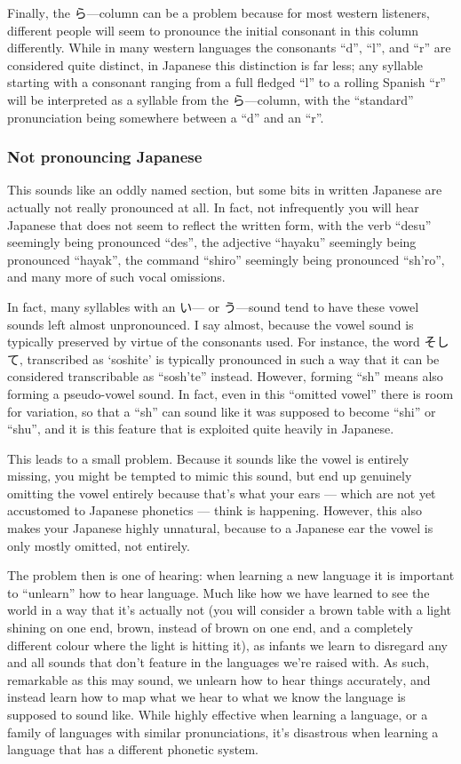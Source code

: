 \documentclass[11pt, b5paper, twoside, openright, onecolumn]{book}
\begin{document}
Finally‚ the ら—column can be a problem because for most western listeners‚ different people will seem to pronounce the initial consonant in this column differently. While in many western languages the consonants “d”‚ “l”‚ and “r” are considered quite distinct‚ in Japanese this distinction is far less; any syllable starting with a consonant ranging from a full fledged “l” to a rolling Spanish “r” will be interpreted as a syllable from the ら—column‚ with the “standard” pronunciation being somewhere between a “d” and an “r”.

\subsubsection{Not pronouncing Japanese}

This sounds like an oddly named section‚ but some bits in written Japanese are actually not really pronounced at all. In fact‚ not infrequently you will hear Japanese that does not seem to reflect the written form‚ with the verb “desu” seemingly being pronounced “des”‚ the adjective “hayaku” seemingly being pronounced “hayak”‚ the command “shiro” seemingly being pronounced “sh’ro”‚ and many more of such vocal omissions.

In fact‚ many syllables with an い— or う—sound tend to have these vowel sounds left almost unpronounced. I say almost‚ because the vowel sound is typically preserved by virtue of the consonants used. For instance‚ the word そして‚ transcribed as ‘soshite’ is typically pronounced in such a way that it can be considered transcribable as “sosh’te” instead. However‚ forming “sh” means also forming a pseudo-vowel sound. In fact‚ even in this “omitted vowel” there is room for variation‚ so that a “sh” can sound like it was supposed to become “shi” or “shu”‚ and it is this feature that is exploited quite heavily in Japanese.

This leads to a small problem. Because it sounds like the vowel is entirely missing‚ you might be tempted to mimic this sound‚ but end up genuinely omitting the vowel entirely because that’s what your ears — which are not yet accustomed to Japanese phonetics — think is happening. However‚ this also makes your Japanese highly unnatural‚ because to a Japanese ear the vowel is only mostly omitted‚ not entirely.

The problem then is one of hearing: when learning a new language it is important to “unlearn” how to hear language. Much like how we have learned to see the world in a way that it’s actually not (you will consider a brown table with a light shining on one end‚ brown‚ instead of brown on one end‚ and a completely different colour where the light is hitting it)‚ as infants we learn to disregard any and all sounds that don’t feature in the languages we’re raised with. As such‚ remarkable as this may sound‚ we unlearn how to hear things accurately‚ and instead learn how to map what we hear to what we know the language is supposed to sound like. While highly effective when learning a language‚ or a family of languages with similar pronunciations‚ it’s disastrous when learning a language that has a different phonetic system.
\end{document}
